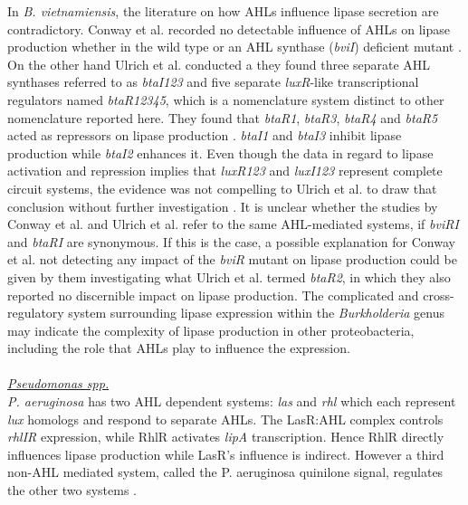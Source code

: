 \documentclass[11pt]{article}
\begin{document}
In \emph{B. vietnamiensis}, the literature on how AHLs influence lipase secretion are contradictory. Conway et al. recorded no detectable influence of AHLs on lipase production whether in the wild type or an AHL synthase (\emph{bviI}) deficient mutant \cite{conway_02}. On the other hand Ulrich et al. conducted a they found three separate AHL synthases referred to as \emph{btaI123} and five separate \emph{luxR}-like transcriptional regulators named \emph{btaR12345}, which is a nomenclature system distinct to other nomenclature reported here. They found that \emph{btaR1}, \emph{btaR3}, \emph{btaR4} and \emph{btaR5} acted as repressors on lipase production \cite{ulrich2004}. \emph{btaI1} and \emph{btaI3} inhibit lipase production while \emph{btaI2} enhances it. Even though the data in regard to lipase activation and repression implies that \emph{luxR123} and \emph{luxI123} represent complete circuit systems, the evidence was not compelling to Ulrich et al. to draw that conclusion without further investigation \cite{ulrich2004}.
It is unclear whether the studies by Conway et al. and Ulrich et al. refer to the same AHL-mediated systems, if \emph{bviRI} and \emph{btaRI} are synonymous. If this is the case, a possible explanation for Conway et al. not detecting any impact of the \emph{bviR} mutant on lipase production could be given by them investigating what Ulrich et al. termed \emph{btaR2}, in which they also reported no discernible impact on lipase production. 
The complicated and cross-regulatory system surrounding lipase expression within the \emph{Burkholderia} genus may indicate the complexity of lipase production in other proteobacteria, including the role that AHLs play to influence the expression.
\\
\\ \emph{\underline{Pseudomonas spp.}}
\\ \emph{P. aeruginosa} has two AHL dependent systems: \emph{las} and \emph{rhl} which each represent \emph{lux} homologs and respond to separate AHLs. The LasR:AHL complex controls \emph{rhlIR} expression, while RhlR activates \emph{lipA} transcription. Hence RhlR directly influences lipase production while LasR's influence is indirect. However a third non-AHL mediated system, called the P. aeruginosa quinilone signal, regulates the other two systems \cite{juhas2005}. 
\end{document}
